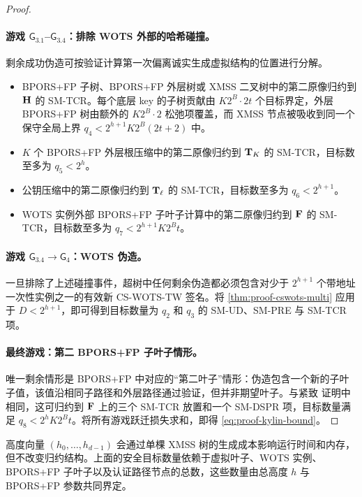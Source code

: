 \begin{proof}
\paragraph{游戏 $\mathsf{G}_{3.1}$--$\mathsf{G}_{3.4}$：排除 WOTS 外部的哈希碰撞。}
剩余成功伪造可按验证计算第一次偏离诚实生成虚拟结构的位置进行分解。
\begin{itemize}
    \item BPORS+FP 子树、BPORS+FP 外层树或 XMSS 二叉树中的第二原像归约到 $\mathbf{H}$ 的 SM-TCR。每个底层 key 的子树贡献由 $K2^B\cdot 2t$ 个目标界定，外层 BPORS+FP 树由额外的 $K2^B\cdot 2$ 松弛项覆盖，而 XMSS 节点被吸收到同一个保守全局上界
    $q_4<2^{h+1}K2^B(2t+2)$ 中。
    \item $K$ 个 BPORS+FP 外层根压缩中的第二原像归约到 $\mathbf{T}_K$ 的 SM-TCR，目标数至多为 $q_5<2^h$。
    \item \WOTSCS 公钥压缩中的第二原像归约到 $\mathbf{T}_\ell$ 的 SM-TCR，目标数至多为 $q_6<2^{h+1}$。
    \item WOTS 实例外部 BPORS+FP 子叶子计算中的第二原像归约到 $\mathbf{F}$ 的 SM-TCR，目标数至多为 $q_7<2^{h+1}K2^Bt$。
\end{itemize}

\paragraph{游戏 $\mathsf{G}_{3.4}\to\mathsf{G}_4$：WOTS 伪造。}
一旦排除了上述碰撞事件，超树中任何剩余伪造都必须包含对少于 $2^{h+1}$ 个带地址一次性实例之一的有效新 CS-WOTS-TW 签名。将 \cref{thm:proof-cswots-multi} 应用于 $D<2^{h+1}$，即可得到目标数量为 $q_2$ 和 $q_3$ 的 SM-UD、SM-PRE 与 SM-TCR 项。

\paragraph{最终游戏：第二 BPORS+FP 子叶子情形。}
唯一剩余情形是 BPORS+FP 中对应的“第二叶子”情形：伪造包含一个新的子叶子值，该值沿相同子路径和外层路径通过验证，但并非期望叶子。与紧致 \SPHINCSP 证明中相同，这可归约到 $\mathbf{F}$ 上的三个 SM-TCR 放置和一个 SM-DSPR 项，目标数量满足 $q_8<2^hK2^Bt$。将所有游戏跃迁损失求和，即得 \cref{eq:proof-kylin-bound}。
\end{proof}

\begin{remark}
高度向量 $(h_0,\ldots,h_{d-1})$ 会通过单棵 XMSS 树的生成成本影响运行时间和内存，但不改变归约结构。上面的安全目标数量依赖于虚拟叶子、WOTS 实例、BPORS+FP 子叶子以及认证路径节点的总数，这些数量由总高度 $h$ 与 BPORS+FP 参数共同界定。
\end{remark}

